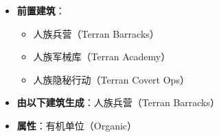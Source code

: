 \begin{tcolorbox}[colback=white, colframe=black!60!white, title=Terran\_Ghost(), arc=0mm]
    \begin{itemize}
    \item \textbf{前置建筑}：
        \begin{itemize}
            \item 人族兵营（Terran Barracks）
            \item 人族军械库（Terran Academy）
            \item 人族隐秘行动（Terran Covert Ops）
        \end{itemize}
    \item \textbf{由以下建筑生成}：人族兵营（Terran Barracks）
    \item \textbf{属性}：有机单位（Organic）
\end{itemize}
\end{tcolorbox}

